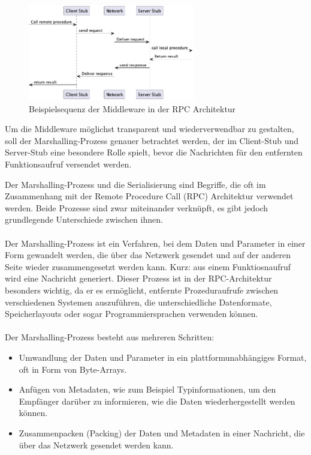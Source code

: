  \begin{figure}[!ht]
  \centering
  \includegraphics[width=0.65\textwidth]{fig/uml/rpc-middleware-seq.png}
  \caption{Beispielsequenz der Middleware in der RPC Architektur}
  \label{fig:rpc-middleware-seq-rpc}
\end{figure}

Um die Middleware möglichst transparent und wiederverwendbar zu gestalten, soll der Marshalling-Prozess genauer betrachtet werden, der im Client-Stub und Server-Stub eine besondere Rolle spielt, bevor die Nachrichten für den entfernten Funktionsaufruf versendet werden. 

Der Marshalling-Prozess und die Serialisierung sind Begriffe, die oft im Zusammenhang mit der Remote Procedure Call (RPC) Architektur verwendet werden. Beide Prozesse sind zwar miteinander verknüpft, es gibt jedoch grundlegende Unterschiede zwischen ihnen.
\\\\
Der Marshalling-Prozess ist ein Verfahren, bei dem Daten und Parameter in einer Form gewandelt werden, die über das Netzwerk gesendet und auf der anderen Seite wieder zusammengesetzt werden kann. Kurz: aus einem Funktiosnaufruf wird eine Nachricht generiert. Dieser Prozess ist in der RPC-Architektur besonders wichtig, da er es ermöglicht, entfernte Prozeduraufrufe zwischen verschiedenen Systemen auszuführen, die unterschiedliche Datenformate, Speicherlayouts oder sogar Programmiersprachen verwenden können.
\\\\
Der Marshalling-Prozess besteht aus mehreren Schritten:
\begin{itemize} 
\item Umwandlung der Daten und Parameter in ein plattformunabhängiges Format, oft in Form von Byte-Arrays.
\item Anfügen von Metadaten, wie zum Beispiel Typinformationen, um den Empfänger darüber zu informieren, wie die Daten wiederhergestellt werden können.
\item Zusammenpacken (Packing) der Daten und Metadaten in einer Nachricht, die über das Netzwerk gesendet werden kann.
\end{itemize} 

